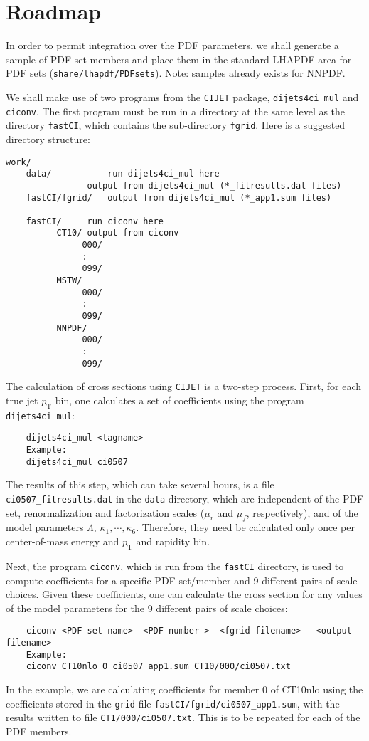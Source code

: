 \documentclass[aps,prd,preprint,nofootinbib]{revtex4}
\begin{document}
\section{Roadmap}
In order to permit integration over the PDF parameters, we shall 
generate a sample of PDF set members and place them in the standard LHAPDF area for PDF sets ({\tt share/lhapdf/PDFsets}). Note: samples already exists for NNPDF. 
	
We shall make use of two programs from the {\tt CIJET} package, {\tt dijets4ci\_mul} and {\tt ciconv}. The
first program must be run in a directory at the same level as the directory {\tt fastCI}, which 
contains the sub-directory {\tt fgrid}. Here is a suggested directory structure:
\begin{verbatim}
work/
	data/			run dijets4ci_mul here
				output from dijets4ci_mul (*_fitresults.dat files)	
	fastCI/fgrid/	output from dijets4ci_mul (*_app1.sum files)
			
	fastCI/		run ciconv here
		  CT10/	output from ciconv
		  	   000/
			   :
			   099/
		  MSTW/
		  	   000/
			   :
			   099/
		  NNPDF/
		  	   000/
			   :
			   099/	
\end{verbatim}
 The calculation of cross sections using {\tt CIJET} is
a two-step process. First, for each true jet $p_\textrm{T}$ bin, 
one calculates a set of coefficients using the program {\tt dijets4ci\_mul}:
\begin{verbatim}
	dijets4ci_mul <tagname>
	Example:
	dijets4ci_mul ci0507 
\end{verbatim}
The results of this step, which can take several hours, is a file {\tt ci0507\_fitresults.dat} in the 
{\tt data} directory, which are  independent of the PDF set, renormalization and factorization scales
($\mu_r$ and $\mu_f$, 
respectively), and of the model parameters $\Lambda$, $\kappa_1,\cdots,\kappa_6$. Therefore, they need be calculated only once per center-of-mass energy and $p_\textrm{T}$ and rapidity bin. 

Next, the program {\tt ciconv}, which is run from the {\tt fastCI} directory, is used to compute coefficients for a specific PDF set/member and 9
different pairs of scale choices. Given these coefficients, one can calculate the cross
section for any values of the model parameters for the 9 different pairs of scale choices:
\begin{verbatim}
	ciconv <PDF-set-name>  <PDF-number >  <fgrid-filename>   <output-filename>
	Example:
	ciconv CT10nlo 0 ci0507_app1.sum CT10/000/ci0507.txt
\end{verbatim}
In the example, we are calculating coefficients for member 0 of CT10nlo using the 
coefficients stored in the {\tt grid} file {\tt fastCI/fgrid/ci0507\_app1.sum}, with the results written
to file {\tt CT1/000/ci0507.txt}. This is to be repeated for each of the PDF members.
\end{document}
